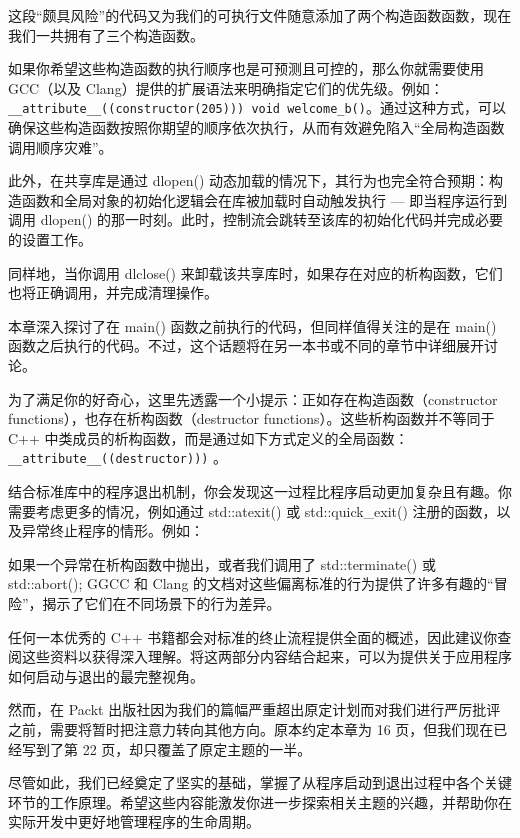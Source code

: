 这段“颇具风险”的代码又为我们的可执行文件随意添加了两个构造函数函数，现在我们一共拥有了三个构造函数。

如果你希望这些构造函数的执行顺序也是可预测且可控的，那么你就需要使用 GCC（以及 Clang）提供的扩展语法来明确指定它们的优先级。例如：\verb|__attribute__((constructor(205))) void welcome_b()|。通过这种方式，可以确保这些构造函数按照你期望的顺序依次执行，从而有效避免陷入“全局构造函数调用顺序灾难”。

此外，在共享库是通过 dlopen() 动态加载的情况下，其行为也完全符合预期：构造函数和全局对象的初始化逻辑会在库被加载时自动触发执行 --- 即当程序运行到调用 dlopen() 的那一时刻。此时，控制流会跳转至该库的初始化代码并完成必要的设置工作。

同样地，当你调用 dlclose() 来卸载该共享库时，如果存在对应的析构函数，它们也将正确调用，并完成清理操作。


本章深入探讨了在 main() 函数之前执行的代码，但同样值得关注的是在 main() 函数之后执行的代码。不过，这个话题将在另一本书或不同的章节中详细展开讨论。

为了满足你的好奇心，这里先透露一个小提示：正如存在构造函数（constructor functions），也存在析构函数（destructor functions）。这些析构函数并不等同于 C++ 中类成员的析构函数，而是通过如下方式定义的全局函数： \verb|__attribute__((destructor)))| 。

结合标准库中的程序退出机制，你会发现这一过程比程序启动更加复杂且有趣。你需要考虑更多的情况，例如通过 std::atexit() 或 std::quick\_exit() 注册的函数，以及异常终止程序的情形。例如：

如果一个异常在析构函数中抛出，或者我们调用了 std::terminate() 或 std::abort(); GGCC 和 Clang 的文档对这些偏离标准的行为提供了许多有趣的“冒险”，揭示了它们在不同场景下的行为差异。

任何一本优秀的 C++ 书籍都会对标准的终止流程提供全面的概述，因此建议你查阅这些资料以获得深入理解。将这两部分内容结合起来，可以为提供关于应用程序如何启动与退出的最完整视角。

然而，在 Packt 出版社因为我们的篇幅严重超出原定计划而对我们进行严厉批评之前，需要将暂时把注意力转向其他方向。原本约定本章为 16 页，但我们现在已经写到了第 22 页，却只覆盖了原定主题的一半。

尽管如此，我们已经奠定了坚实的基础，掌握了从程序启动到退出过程中各个关键环节的工作原理。希望这些内容能激发你进一步探索相关主题的兴趣，并帮助你在实际开发中更好地管理程序的生命周期。